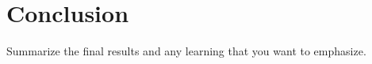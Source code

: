 \section*{Conclusion}

Summarize the final results and any learning that you want to emphasize.

\FloatBarrier









